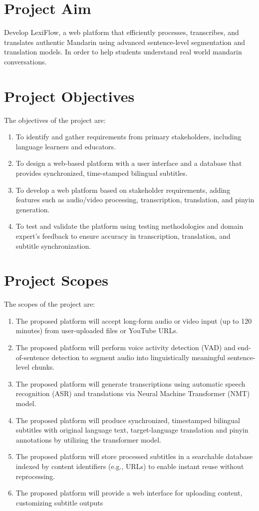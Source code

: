 \documentclass[oneside]{utmthesis}
\begin{document}
\section{Project Aim}
Develop LexiFlow, a web platform that efficiently processes, transcribes, and translates authentic Mandarin using advanced sentence-level segmentation and translation models. In order to help students understand real world mandarin conversations.
\section{Project Objectives}\label{sec:obj}
The objectives of the project are:
\begin{enumerate}[label= (\alph*)]
    \item To identify and gather requirements from primary stakeholders, including language learners and educators.
    \item To design a web-based platform with a user interface and a database that provides synchronized, time-stamped bilingual subtitles.
    \item To develop a web platform based on stakeholder requirements, adding features such as audio/video processing, transcription, translation, and pinyin generation.
    \item To test and validate the platform using testing methodologies and domain expert's feedback to ensure accuracy in transcription, translation, and subtitle synchronization.
\end{enumerate}
\section{Project Scopes}
The scopes of the project are:
\begin{enumerate}[label= (\alph*)]
    \item The proposed platform will accept long-form audio or video input (up to 120 minutes) from user-uploaded files or YouTube URLs.
    \item The proposed platform will perform voice activity detection (VAD) and end-of-sentence detection to segment audio into linguistically meaningful sentence-level chunks.
    \item The proposed platform will generate transcriptions using automatic speech recognition (ASR) and translations via Neural Machine Transformer (NMT) model.
    \item The proposed platform will produce synchronized, timestamped bilingual subtitles with original language text, target-language translation and pinyin annotations by utilizing the transformer model.
    \item The proposed platform will store processed subtitles in a searchable database indexed by content identifiers (e.g., URLs) to enable instant reuse without reprocessing.
    \item The proposed platform will provide a web interface for uploading content, customizing subtitle outputs
\end{enumerate}
\end{document}
